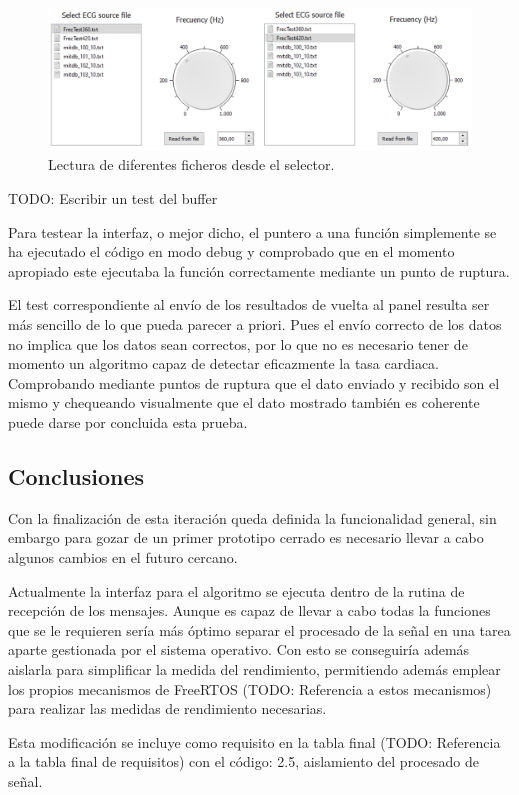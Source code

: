         \begin{figure}[H]
                \centering
                        \includegraphics[width = \linewidth]{figuras/FileSelectorTest.png}
                \caption{Lectura de diferentes ficheros desde el selector.}
                \label{fig:fileSelectorTest}
        \end{figure}

        TODO: Escribir un test del buffer

        Para testear la interfaz, o mejor dicho, el puntero a una función simplemente se ha ejecutado el código en modo debug y comprobado que en el momento apropiado este ejecutaba la función correctamente mediante un punto de ruptura. 

        El test correspondiente al envío de los resultados de vuelta al panel resulta ser más sencillo de lo que pueda parecer a priori. Pues el envío correcto de los datos no implica que los datos sean correctos, por lo que no es necesario tener de momento un algoritmo capaz de detectar eficazmente la tasa cardiaca. Comprobando mediante puntos de ruptura que el dato enviado y recibido son el mismo y chequeando visualmente que el dato mostrado también es coherente puede darse por concluida esta prueba.

        
    \subsection{Conclusiones}
    
        Con la finalización de esta iteración queda definida la funcionalidad general, sin embargo para gozar de un primer prototipo cerrado es necesario llevar a cabo algunos cambios en el futuro cercano.
        
        Actualmente la interfaz para el algoritmo se ejecuta dentro de la rutina de recepción de los mensajes. Aunque es capaz de llevar a cabo todas la funciones que se le requieren sería más óptimo separar el procesado de la señal en una tarea aparte gestionada por el sistema operativo. Con esto se conseguiría además aislarla para simplificar la medida del rendimiento, permitiendo además emplear los propios mecanismos de FreeRTOS (TODO: Referencia a estos mecanismos) para realizar las medidas de rendimiento necesarias.
        
        Esta modificación se incluye como requisito en la tabla final (TODO: Referencia a la tabla final de requisitos) con el código: 2.5, aislamiento del procesado de señal.